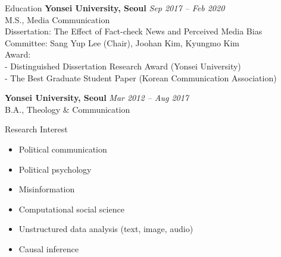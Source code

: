 \documentclass{resume} %
\begin{document}

\begin{rSection}{Education}
{\bf Yonsei University, Seoul} \hfill {\em Sep 2017 -- Feb 2020}
\\ M.S., Media Communication
\\\hspace*{3mm} \textbullet{} Dissertation: The Effect of Fact-check News and Perceived Media Bias
\\\hspace*{3mm} \textbullet{} Committee: Sang Yup Lee (Chair), Joohan Kim, Kyungmo Kim
\\\hspace*{3mm} \textbullet{} Award:
\\\hspace*{6mm} - Distinguished Dissertation Research Award (Yonsei University)
\\\hspace*{6mm} - The Best Graduate Student Paper (Korean Communication Association)

{\bf Yonsei University, Seoul} \hfill {\em Mar 2012 -- Aug 2017}
\\ B.A., Theology \& Communication
\end{rSection}

\begin{rSection}{Research Interest}
\begin{minipage}[t]{.4\textwidth}

\begin{itemize}
    \setlength{\leftskip}{-0.4in}
    \item [] Political communication
    \item [] Political psychology
    \item [] Misinformation
\end{itemize}

\end{minipage}
\begin{minipage}[t]{.6\textwidth}
\begin{itemize}
    \item [] Computational social science
    \item [] Unstructured data analysis (text, image, audio)
    \item [] Causal inference
\end{itemize}
\end{minipage}

\end{rSection}
\end{document}
